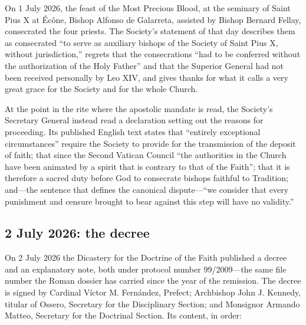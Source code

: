On 1 July 2026, the feast of the Most Precious Blood, at the seminary of
Saint Pius X at Écône, Bishop Alfonso de Galarreta, assisted by Bishop
Bernard Fellay, consecrated the four priests. The Society's statement of
that day describes them as consecrated ``to serve as auxiliary bishops of
the Society of Saint Pius X, without jurisdiction,'' regrets that the
consecrations ``had to be conferred without the authorization of the Holy
Father'' and that the Superior General had not been received personally
by Leo XIV, and gives thanks for what it calls a very great grace for the
Society and for the whole Church.

At the point in the rite where the apostolic mandate is read, the
Society's Secretary General instead read a declaration setting out the
reasons for proceeding. Its published English text states that ``entirely
exceptional circumstances'' require the Society to provide for the
transmission of the deposit of faith; that since the Second Vatican
Council ``the authorities in the Church have been animated by a spirit
that is contrary to that of the Faith''; that it is therefore a sacred
duty before God to consecrate bishops faithful to Tradition; and---the
sentence that defines the canonical dispute---``we consider that every
punishment and censure brought to bear against this step will have no
validity.''

\subsection{2 July 2026: the decree}

On 2 July 2026 the Dicastery for the Doctrine of the Faith published a
decree and an explanatory note, both under protocol number 99/2009---the
same file number the Roman dossier has carried since the year of the
remission. The decree is signed by Cardinal Víctor M. Fernández, Prefect;
Archbishop John J. Kennedy, titular of Ossero, Secretary for the
Disciplinary Section; and Monsignor Armando Matteo, Secretary for the
Doctrinal Section. Its content, in order:

